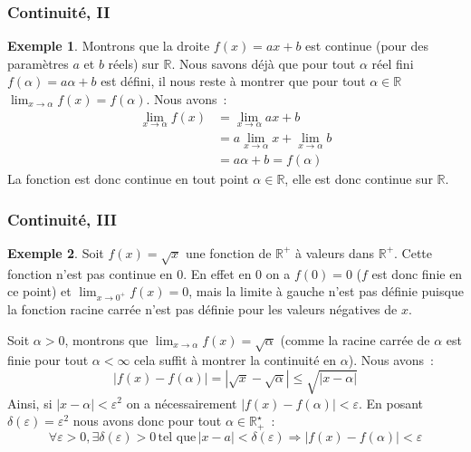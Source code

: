\documentclass[10pt,notheorems]{beamer}
\theoremstyle{plain}
\theoremstyle{definition} %
\newtheorem{example}{Exemple}
\begin{document}
\begin{frame}
  \frametitle{Continuité, II}

  \begin{example}
    Montrons que la droite $f(x) = ax+b$ est continue (pour des paramètres $a$ et $b$ réels) sur $\mathbb R$. Nous savons déjà que pour tout $\alpha$ réel fini $f(\alpha) = a\alpha+b$ est défini, il nous reste à montrer que pour tout $\alpha\in\mathbb R$ $\lim_{x\rightarrow\alpha}f(x)=f(\alpha)$. Nous avons~:
    \[
      \begin{split}
        \lim_{x\rightarrow\alpha}f(x) &= \lim_{x\rightarrow\alpha} ax+b\\
        &= a\lim_{x\rightarrow\alpha} x + \lim_{x\rightarrow\alpha} b\\
        &= a\alpha + b = f(\alpha)
      \end{split}
    \]
    La fonction est donc continue en tout point $\alpha\in\mathbb R$, elle est donc continue sur $\mathbb R$.
  \end{example}

\end{frame}


\begin{frame}
  \frametitle{Continuité, III}

  \begin{example}

    Soit $f(x) = \sqrt{x}$ une fonction de  $\mathbb R^+$ à valeurs dans $\mathbb R^+$. Cette fonction n'est pas continue en 0. En effet en 0 on a $f(0) = 0$ ($f$ est donc finie en ce point) et $\lim_{x\rightarrow 0^+}f(x) = 0$, mais la limite à gauche n'est pas définie puisque la fonction racine carrée n'est pas définie pour les valeurs négatives de $x$.\newline

    Soit $\alpha>0$, montrons que $\lim_{x\rightarrow \alpha}f(x) = \sqrt{\alpha}$ (comme la racine carrée de $\alpha$ est finie pour tout $\alpha<\infty$ cela suffit à montrer la continuité en $\alpha$). Nous avons~:
    \[
      |f(x)-f(\alpha)| = |\sqrt{x}-\sqrt{\alpha}| \leq \sqrt{|x-\alpha|}
    \]
    Ainsi, si $|x-\alpha|<\varepsilon^2$ on a nécessairement $|f(x)-f(\alpha)|<\varepsilon$. En posant $\delta(\varepsilon) = \varepsilon^2$ nous avons donc pour tout $\alpha\in\mathbb R_+^{\star}$~:
    \[
      \forall \varepsilon>0, \exists \delta(\varepsilon)>0\,\text{tel que}\, |x-a|<\delta(\varepsilon)\Rightarrow |f(x)-f(\alpha)|<\varepsilon
    \]
  \end{example}

\end{frame}
\end{document}
